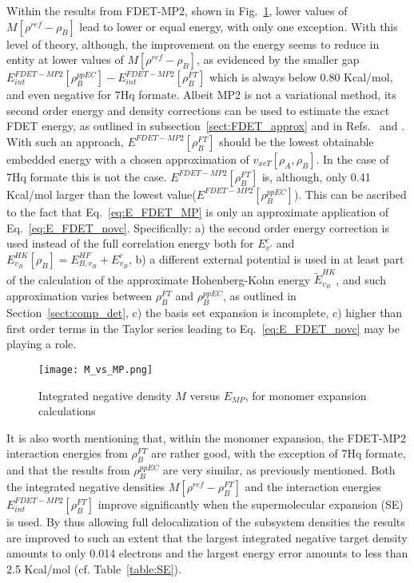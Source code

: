 \documentclass[journal=jctcce,manuscript=article, layout=twocolumn]{achemso}
\begin{document}
Within the results from FDET-MP2, shown in Fig.~\ref{fig:M_vs_MP}, lower values of $M[\rho^{ref} - \rho_B]$ lead to lower or equal energy, with only one exception.
With this level of theory, although, the improvement on the energy seems to reduce in entity at lower values of $M[\rho^{ref} - \rho_B]$, as evidenced by the smaller gap $E^{FDET-MP2}_{int}[\rho_B^{ppEC}] - E^{FDET-MP2}_{int}[\rho_B^{FT}]$ which is always below 0.80 Kcal/mol, and even negative for 7Hq formate.
Albeit MP2 is not a variational method, its second order energy and density corrections can be used to estimate the exact FDET energy, as outlined in subsection~\ref{sect:FDET_approx} and in Refs.~ and . With such an approach, $E^{FDET-MP2}[\rho_B^{FT}]$ should be the lowest obtainable embedded energy with a chosen approximation of $v_{xcT}[\rho_A,\rho_B]$. In the case of 7Hq formate this is not the case. $E^{FDET-MP2}[\rho_B^{FT}]$ is, although, only 0.41 Kcal/mol larger than the lowest value($E^{FDET-MP2}[\rho_B^{ppEC}]$). This can be ascribed to the fact that Eq.~\ref{eq:E_FDET_MP} is only an approximate application of Eq.~\ref{eq:E_FDET_novc}. Specifically: a) the second order energy correction is used instead of the full correlation energy both for $E^c_{v'}$ and $E^{HK}_{v_B}[\rho_B] = E^{HF}_{B,v_B}+E^c_{v_B}$, b) a different external potential is used in at least part of the calculation of the approximate Hohenberg-Kohn energy $\tilde{E}^{HK}_{v_B}$, and such approximation varies between $\rho_B^{FT}$ and $\rho_B^{ppEC}$, as outlined in Section~\ref{sect:comp_det}, c) the basis set expansion is incomplete, c) higher than first order terms in the Taylor series leading to Eq.~\ref{eq:E_FDET_novc} may be playing a role.

\begin{figure}[H]
\centering
\texttt{[image: M\_vs\_MP.png]}
\caption{Integrated negative density $M$ versus $E_{MP}$, for monomer expansion calculations}
\label{fig:M_vs_MP}
\end{figure}

It is also worth mentioning that, within the monomer expansion, the FDET-MP2 interaction energies from $\rho_B^{FT}$ are rather good, with the exception of 7Hq formate, and that the results from  $\rho_B^{ppEC}$ are very similar, as previously mentioned. Both the integrated negative densities $M[\rho^{ref} - \rho^{FT}_{B}]$ and the interaction energies $E^{FDET-MP2}_{int}[\rho^{FT}_B]$ improve significantly when the supermolecular expansion (SE) is used. By thus allowing full delocalization of the subsystem densities the results are improved to such an extent that the largest integrated negative target density amounts to only 0.014 electrons and the largest energy error amounts to less than 2.5 Kcal/mol (cf. Table~\ref{table:SE}).
\end{document}
